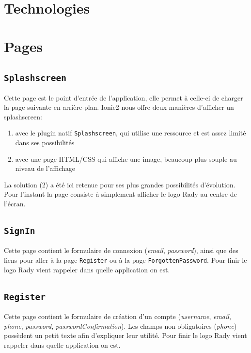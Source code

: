 \documentclass[french]{article}
\begin{document}
	\section{Technologies}
		
	\section{Pages}
		
		\subsection{\texttt{Splashscreen}}
			Cette page est le point d'entrée de l'application, elle permet à celle-ci de charger la page suivante en arrière-plan. Ionic2 nous offre deux manières d'afficher un splashscreen:
			\begin{enumerate}
				\item avec le plugin natif \texttt{Splashscreen}, qui utilise une ressource et est assez limité dans ses possibilités
				\item avec une page HTML/CSS qui affiche une image, beaucoup plus souple au niveau de l'affichage
			\end{enumerate}
			La solution (2) a été ici retenue pour ses plus grandes possibilités d'évolution.\\
			
			Pour l'instant la page consiste à simplement afficher le logo Rady au centre de l'écran.
			
		\subsection{\texttt{SignIn}}
			Cette page contient le formulaire de connexion (\textit{email}, \textit{password}), ainsi que des liens pour aller à la page \texttt{Register} ou à la page \texttt{ForgottenPassword}. Pour finir le logo Rady vient rappeler dans quelle application on est.
		
		\subsection{\texttt{Register}}
			Cette page contient le formulaire de création d'un compte (\textit{username}, \textit{email}, \textit{phone}, \textit{password}, \textit{passwordConfirmation}). Les champs non-obligatoires (\textit{phone}) possèdent un petit texte afin d'expliquer leur utilité. Pour finir le logo Rady vient rappeler dans quelle application on est. 
			
\end{document}
